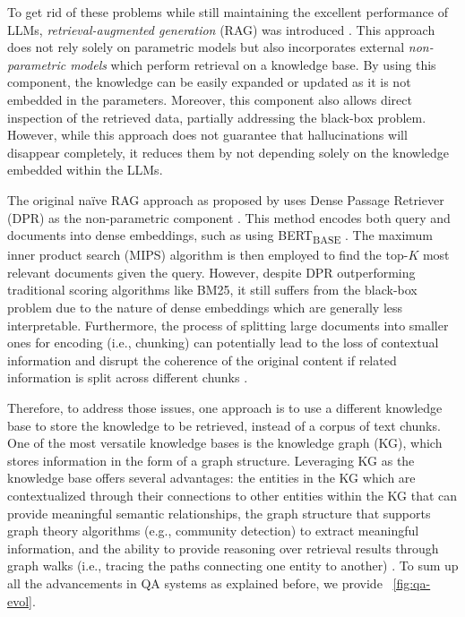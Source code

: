To get rid of these problems while still maintaining the excellent performance of LLMs, \textit{retrieval-augmented generation} (RAG) was introduced \citep{lewis2021retrievalaugmentedgenerationknowledgeintensivenlp}. This approach does not rely solely on parametric models but also incorporates external \textit{non-parametric models} which perform retrieval on a knowledge base. By using this component, the knowledge can be easily expanded or updated as it is not embedded in the parameters. Moreover, this component also allows direct inspection of the retrieved data, partially addressing the black-box problem. However, while this approach does not guarantee that hallucinations will disappear completely, it reduces them by not depending solely on the knowledge embedded within the LLMs.

The original na\"{i}ve RAG approach as proposed by \cite{lewis2021retrievalaugmentedgenerationknowledgeintensivenlp} uses Dense Passage Retriever (DPR) as the non-parametric component \citep{karpukhin2020densepassageretrievalopendomain}. This method encodes both query and documents into dense embeddings, such as using BERT\textsubscript{BASE} \citep{lewis2021retrievalaugmentedgenerationknowledgeintensivenlp}. The maximum inner product search (MIPS) algorithm is then employed to find the top-$K$ most relevant documents given the query. However, despite DPR outperforming traditional scoring algorithms like BM25, it still suffers from the black-box problem due to the nature of dense embeddings which are generally less interpretable. Furthermore, the process of splitting large documents into smaller ones for encoding (i.e., chunking) can potentially lead to the loss of contextual information and disrupt the coherence of the original content if related information is split across different chunks \citep{sarmah2024hybridragintegratingknowledgegraphs}.

Therefore, to address those issues, one approach is to use a different knowledge base to store the knowledge to be retrieved, instead of a corpus of text chunks. One of the most versatile knowledge bases is the knowledge graph (KG), which stores information in the form of a graph structure. Leveraging KG as the knowledge base offers several advantages: the entities in the KG which are contextualized through their connections to other entities within the KG that can provide meaningful semantic relationships, the graph structure that supports graph theory algorithms (e.g., community detection) to extract meaningful information, and the ability to provide reasoning over retrieval results through graph walks (i.e., tracing the paths connecting one entity to another) \citep{informatics9010006}. To sum up all the advancements in QA systems as explained before, we provide \pic~\ref{fig:qa-evol}.

